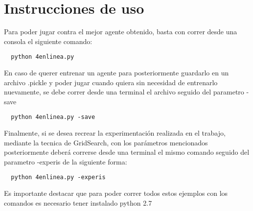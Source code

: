 \section{Instrucciones de uso}
Para poder jugar contra el mejor agente obtenido, basta con correr desde una consola el siguiente comando:
\begin{verbatim}
  python 4enlinea.py
\end{verbatim}
En caso de querer entrenar un agente para posteriormente guardarlo en un archivo .pickle y poder jugar cuando quiera sin necesidad
de entrenarlo nuevamente, se debe correr desde una terminal el archivo seguido del parametro -save
\begin{verbatim}
  python 4enlinea.py -save
\end{verbatim}
Finalmente, si se desea recrear la experimentación realizada en el trabajo, mediante la tecnica de GridSearch, con los parámetros mencionados
posteriormente deberá correrse desde una terminal el mismo comando seguido del parametro -experis de la siguiente forma:
\begin{verbatim}
  python 4enlinea.py -experis
\end{verbatim}
Es importante destacar que para poder correr todos estos ejemplos con los comandos es necesario tener instalado python 2.7
%
%
%
%
%
%
%

